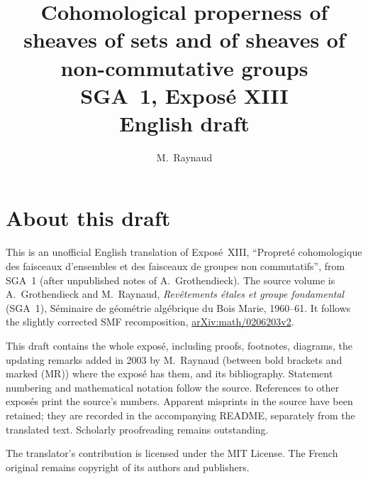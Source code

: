 \documentclass[11pt,a4paper,oneside]{amsbook}
\title[SGA~1, Expos\'e XIII (English draft)]{Cohomological properness of sheaves of sets and of sheaves of non-commutative groups\\
{\normalsize SGA~1, Expos\'e XIII\\English draft}}
\author{M.\ Raynaud}
\date{}
\begin{document}
\frontmatter
\maketitle

\chapter*{About this draft}
This is an unofficial English translation of Expos\'e~XIII,
``Propret\'e cohomologique des faisceaux d'ensembles et des faisceaux de groupes non commutatifs'', from SGA~1 (after unpublished notes of A.\ Grothendieck). The source volume is
A.\ Grothendieck and M.\ Raynaud,
\textit{Rev\^etements \'etales et groupe fondamental} (SGA~1),
S\'eminaire de g\'eom\'etrie alg\'ebrique du Bois Marie, 1960--61.
It follows the slightly corrected SMF recomposition,
\href{https://arxiv.org/abs/math/0206203v2}{arXiv:math/0206203v2}.

This draft contains the whole expos\'e, including proofs, footnotes,
diagrams, the updating remarks added in 2003 by M.~Raynaud (between bold
brackets and marked (MR)) where the expos\'e has them, and its bibliography.
Statement numbering and mathematical notation follow the source.
References to other expos\'es print the source's numbers. Apparent
misprints in the source have been retained; they are recorded in the
accompanying README, separately from the translated text. Scholarly
proofreading remains outstanding.

The translator's contribution is licensed under
the MIT License.
The French original remains copyright of its authors and publishers.

\tableofcontents
\mainmatter
\setcounter{chapter}{12}








\end{document}

